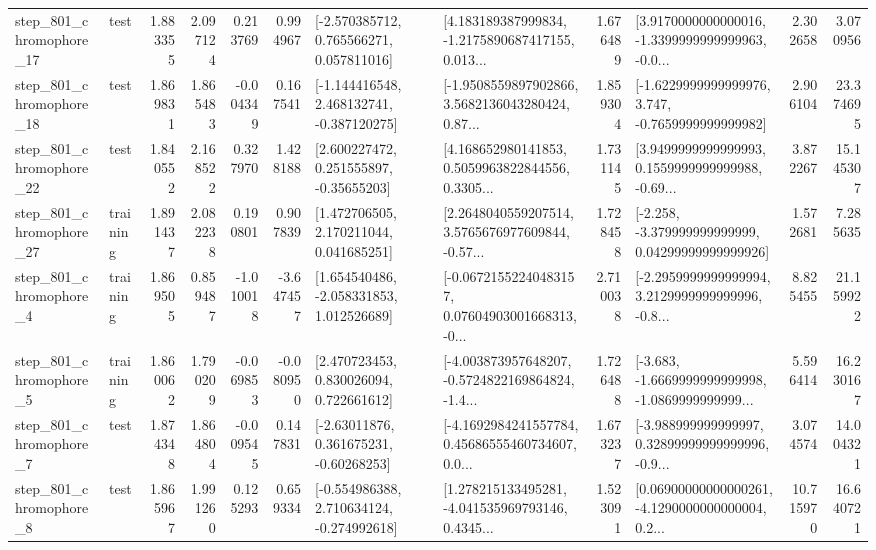 \begin{tabular}{llrrrrllrlrr}
  step\_801\_chromophore\_17 &      test &      1.883355 &    2.097124 &      0.213769 &  0.994967 &    [-2.570385712, 0.765566271, 0.057811016] &  [4.183189387999834, -1.2175890687417155, 0.013... &       1.676489 &  [3.9170000000000016, -1.3399999999999963, -0.0... &            2.302658 &          3.070956 \\
  step\_801\_chromophore\_18 &      test &      1.869831 &    1.865483 &     -0.004349 &  0.167541 &   [-1.144416548, 2.468132741, -0.387120275] &  [-1.9508559897902866, 3.5682136043280424, 0.87... &       1.859304 &  [-1.6229999999999976, 3.747, -0.7659999999999982] &            2.906104 &         23.374695 \\
  step\_801\_chromophore\_22 &      test &      1.840552 &    2.168522 &      0.327970 &  1.428188 &     [2.600227472, 0.251555897, -0.35655203] &  [4.168652980141853, 0.5059963822844556, 0.3305... &       1.731145 &  [3.9499999999999993, 0.1559999999999988, -0.69... &            3.872267 &         15.145307 \\
  step\_801\_chromophore\_27 &  training &      1.891437 &    2.082238 &      0.190801 &  0.907839 &     [1.472706505, 2.170211044, 0.041685251] &  [2.2648040559207514, 3.5765676977609844, -0.57... &       1.728458 &  [-2.258, -3.379999999999999, 0.04299999999999926] &            1.572681 &          7.285635 \\
   step\_801\_chromophore\_4 &  training &      1.869505 &    0.859487 &     -1.010018 & -3.647457 &    [1.654540486, -2.058331853, 1.012526689] &  [-0.06721552240483157, 0.07604903001668313, -0... &       2.710038 &  [-2.2959999999999994, 3.2129999999999996, -0.8... &            8.825455 &         21.159922 \\
   step\_801\_chromophore\_5 &  training &      1.860062 &    1.790209 &     -0.069853 & -0.080950 &     [2.470723453, 0.830026094, 0.722661612] &  [-4.003873957648207, -0.5724822169864824, -1.4... &       1.726488 &  [-3.683, -1.6669999999999998, -1.0869999999999... &            5.596414 &         16.230167 \\
   step\_801\_chromophore\_7 &      test &      1.874348 &    1.864804 &     -0.009545 &  0.147831 &     [-2.63011876, 0.361675231, -0.60268253] &  [-4.1692984241557784, 0.45686555460734607, 0.0... &       1.673237 &  [-3.988999999999997, 0.32899999999999996, -0.9... &            3.074574 &         14.004321 \\
   step\_801\_chromophore\_8 &      test &      1.865967 &    1.991260 &      0.125293 &  0.659334 &   [-0.554986388, 2.710634124, -0.274992618] &  [1.278215133495281, -4.041535969793146, 0.4345... &       1.523091 &  [0.06900000000000261, -4.1290000000000004, 0.2... &           10.715970 &         16.640721 \\

\end{tabular}
